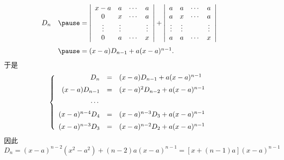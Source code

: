 \begin{frame}
    \begin{center}
    \end{center}

  \begin{footnotesize}    
    $$
    \begin{array}{ll}
      D_n & \pause = \left|
      \begin{array}{cccc}
        x-a  & a  & \cd & a   \\
        0    & x  & \cd & a   \\
        \vd  &\vd &     & \vd \\
        0    & a  & \cd & x 
      \end{array}
      \right|
      +\left|
      \begin{array}{cccc}
        a   & a  & \cd & a   \\
        a   & x  & \cd & a   \\
        \vd &\vd &     & \vd \\
        a   & a  & \cd & x 
      \end{array}
      \right| \\[1.0cm]
      &\pause = (x-a) D_{n-1} + a(x-a)^{n-1}.
    \end{array}
    $$ \pause 
    于是
    $$
    \left\{
    \begin{array}{rcl}
      D_n           &=& (x-a)D_{n-1} + a(x-a)^{n-1} \\[0.2cm]
      (x-a)D_{n-1}      &=& (x-a)^2D_{n-2} + a(x-a)^{n-1} \\[0.2cm]
      \cdots           && \\ [0.2cm]
      (x-a)^{n-4}D_4 &=& (x-a)^{n-3}D_{3} + a(x-a)^{n-1}\\ [0.2cm]
      (x-a)^{n-3}D_3 &=& (x-a)^{n-2}D_{2} + a(x-a)^{n-1}
    \end{array}
    \right.
    $$ \pause 
    因此
    $$
    D_n = (x-a)^{n-2}(x^2-a^2) + (n-2)a(x-a)^{n-1} = [x+(n-1)a](x-a)^{n-1}      
    $$
  \end{footnotesize}
\end{frame}


